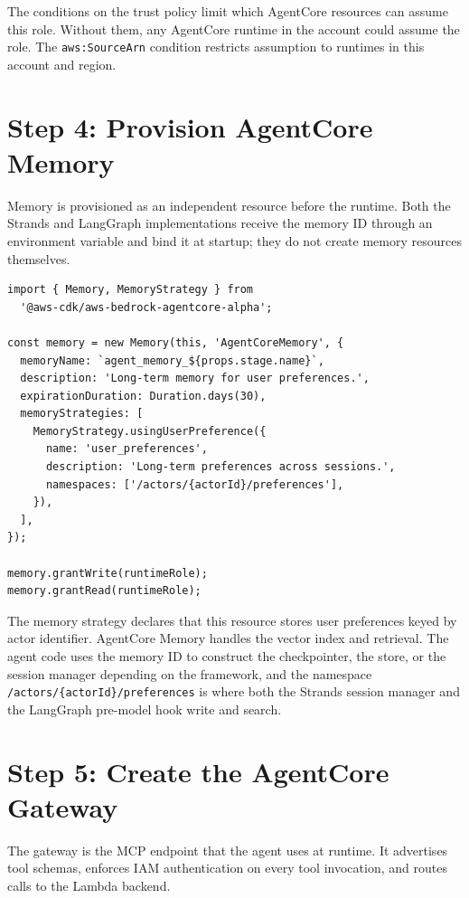 The conditions on the trust policy limit which AgentCore resources can assume this role.
Without them, any AgentCore runtime in the account could assume the role. The
\texttt{aws:SourceArn} condition restricts assumption to runtimes in this account and
region.

\section{Step 4: Provision AgentCore Memory}

Memory is provisioned as an independent resource before the runtime. Both the Strands and
LangGraph implementations receive the memory ID through an environment variable and bind
it at startup; they do not create memory resources themselves.

\begin{lstlisting}
import { Memory, MemoryStrategy } from
  '@aws-cdk/aws-bedrock-agentcore-alpha';

const memory = new Memory(this, 'AgentCoreMemory', {
  memoryName: `agent_memory_${props.stage.name}`,
  description: 'Long-term memory for user preferences.',
  expirationDuration: Duration.days(30),
  memoryStrategies: [
    MemoryStrategy.usingUserPreference({
      name: 'user_preferences',
      description: 'Long-term preferences across sessions.',
      namespaces: ['/actors/{actorId}/preferences'],
    }),
  ],
});

memory.grantWrite(runtimeRole);
memory.grantRead(runtimeRole);
\end{lstlisting}

The memory strategy declares that this resource stores user preferences keyed by actor
identifier. AgentCore Memory handles the vector index and retrieval. The agent code uses
the memory ID to construct the checkpointer, the store, or the session manager depending
on the framework, and the namespace \texttt{/actors/\{actorId\}/preferences} is where
both the Strands session manager and the LangGraph pre-model hook write and search.

\section{Step 5: Create the AgentCore Gateway}

The gateway is the MCP endpoint that the agent uses at runtime. It advertises tool
schemas, enforces IAM authentication on every tool invocation, and routes calls to the
Lambda backend.

